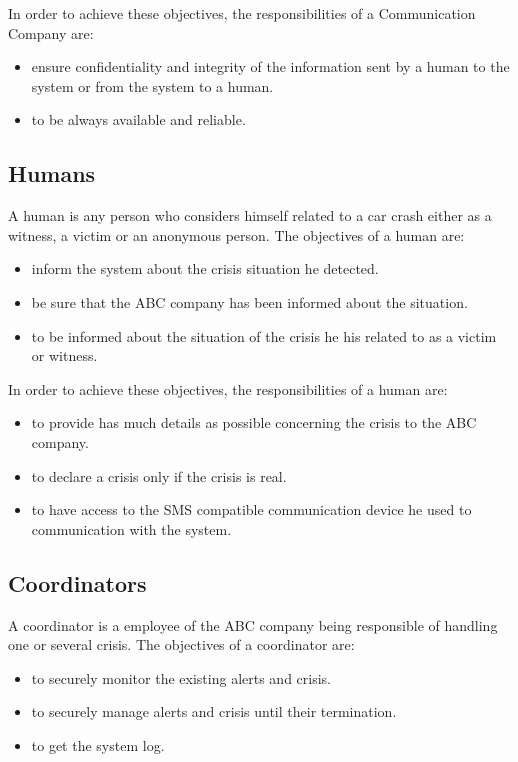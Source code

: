 In order to achieve these objectives, the responsibilities of a Communication Company are:
\begin{itemize}
  \item ensure confidentiality and integrity of the information sent by a human to the \msricrash system or from the system to a human.
  \item to be always available and reliable.
\end{itemize}

\subsection{Humans}
A human is any person who considers himself related to a car crash either as a witness, a victim or an anonymous person. The objectives of a human are:
\begin{itemize}
  \item inform the \msricrash system about the crisis situation he detected.
  \item be sure that the ABC company has been informed about the situation.
  \item to be informed about the situation of the crisis he his related to as a victim or witness.
\end{itemize}
\vspace{0.5cm}

In order to achieve these objectives, the responsibilities of a human are:
\begin{itemize}
  \item to provide has much details as possible concerning the crisis to the ABC company.
  \item to declare a crisis only if the crisis is real.
  \item to have access to the SMS compatible communication device he used to communication with the \msricrash system.
\end{itemize}

\subsection{Coordinators}
A coordinator is a employee of the ABC company being responsible of handling one or several crisis. The objectives of a coordinator are:
\begin{itemize}
  \item to securely monitor the existing alerts and crisis.
  \item to securely manage alerts and crisis until their termination.
  \item to get the system log.
\end{itemize}
\vspace{0.5cm}

